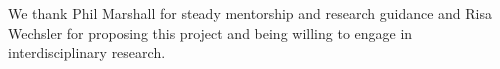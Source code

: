 % 
We thank Phil Marshall for steady mentorship and research guidance and Risa Wechsler for proposing this project and being willing to engage in interdisciplinary research.
% 
